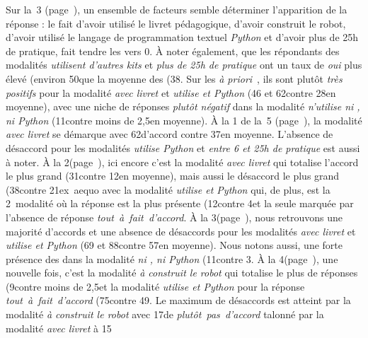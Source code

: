             Sur la~3 ({\footnotesize page~\pageref{QA3}}), un ensemble de facteurs semble déterminer l'apparition de la réponse : le fait d'avoir utilisé le livret pédagogique, d'avoir construit le robot, d'avoir utilisé le langage de programmation textuel \textit{Python} et d'avoir plus de 25h de pratique, fait tendre les  vers 0. À noter également, que les répondants des modalités \textit{utilisent d'autres kits} et \textit{plus de 25h de pratique} ont un taux de \textit{oui} plus élevé (environ 50\prc[)] que la moyenne des  (38\prc[)].
            Sur les \textit{à priori}~, ils sont plutôt \textit{très positifs} pour la modalité \textit{avec livret} et \textit{utilise  et Python} (46 et 62\prc contre 28\prc en moyenne), avec une niche de réponses \textit{plutôt négatif} dans la modalité \textit{n'utilise ni , ni Python} (11\prc contre moins de 2,5\prc en moyenne).
            À la 1\iere {} de la~5 ({\footnotesize page~\pageref{QA5-1}}), la modalité \textit{avec livret} se démarque avec 62\prc d'accord contre 37\prc en moyenne. L'absence de désaccord pour les modalités \textit{utilise Python} et \textit{entre 6 et 25h de pratique} est aussi à noter.
            À la 2\ieme {}({\footnotesize page~\pageref{QA5-2}}), ici encore c'est la modalité \textit{avec livret} qui totalise l'accord le plus grand (31\prc contre 12\prc en moyenne), mais aussi le désaccord le plus grand (38\prc contre 21\prc[)] ex~aequo avec la modalité \textit{utilise  et Python} qui, de plus, est la 2\nde~modalité où la réponse  est la plus présente (12\prc contre 4\prc[)] et la seule marquée par l'absence de réponse \textit{tout~à~fait~d'accord}.
            À la 3\ieme {}({\footnotesize page~\pageref{QA5-3}}), nous retrouvons une majorité d'accords et une absence de désaccords pour les modalités \textit{avec livret} et \textit{utilise  et Python} (69 et 88\prc contre 57\prc en moyenne). Nous notons aussi, une forte présence des  dans la modalité \textit{ni , ni Python} (11\prc contre 3\prc[)].
            À la 4\ieme {}({\footnotesize page~\pageref{QA5-4}}), une nouvelle fois, c'est la modalité \textit{à construit le robot} qui totalise le plus de réponses  (9\prc contre moins de 2,5\prc[)] et la modalité \textit{utilise  et Python} pour la réponse \textit{tout~à~fait~d'accord} (75\prc contre 49\prc[)].
            Le maximum de désaccords est atteint par la modalité \textit{à construit le robot} avec 17\prc de \textit{plutôt~pas~d'accord} talonné par la modalité \textit{avec livret} à 15\prc[.]
